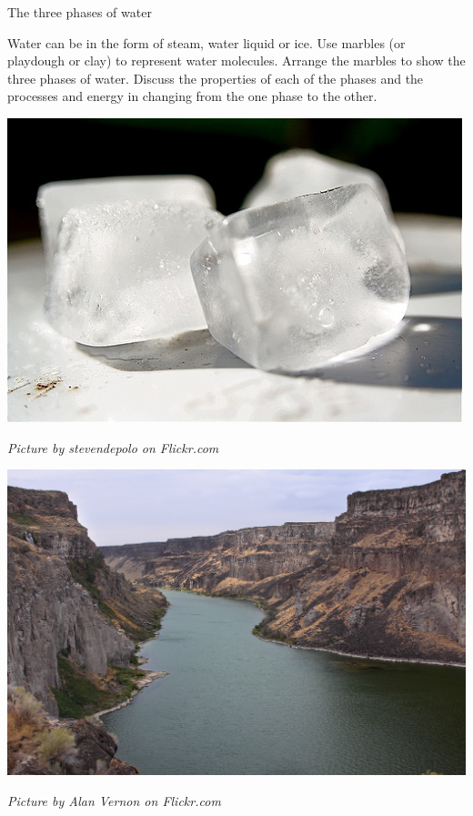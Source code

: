 \begin{activity}{The three phases of water}
\begin{minipage}{0.5\textwidth}
Water can be in the form of steam, water liquid or ice. Use marbles (or playdough or clay) to represent water molecules. Arrange the marbles to show the three phases of water. Discuss the properties of each of the phases and the processes and energy in changing from the one phase to the other. 
\end{minipage}
\begin{minipage}{.5\textwidth}
\begin{center}
 \includegraphics[width=.3\textwidth]{photos/iceby-stevendepolo-flickr.jpg}\par
\textit{Picture by stevendepolo on Flickr.com}
\end{center}
\begin{center}
 \includegraphics[width=.3\textwidth]{photos/AlanVernon.jpg}\par
\textit{Picture by Alan Vernon on Flickr.com}
\end{center}
\end{minipage}
\end{activity}

